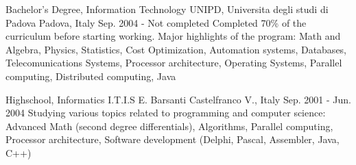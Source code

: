 
\begin{cventries}

  \cventry
    {Bachelor's Degree, Information Technology} %
    {UNIPD, Universita degli studi di Padova \textmd{}} %
    {Padova, Italy} %
    {Sep. 2004 - Not completed} %
    {Completed 70\% of the curriculum before starting working. Major highlights of the program:\newline
    Math and Algebra, Physics, Statistics, Cost Optimization, Automation systems, Databases, Telecomunications Systems, Processor architecture, Operating Systems, Parallel computing, Distributed computing, Java
    }

  \cventry
    {Highschool, Informatics} %
    {I.T.I.S E. Barsanti} %
    {Castelfranco V., Italy} %
    {Sep. 2001 - Jun. 2004} %
    {Studying various topics related to programming and computer science:\newline
    Advanced Math (second degree differentials), Algorithms, Parallel computing, Processor architecture, Software development (Delphi, Pascal, Assembler, Java, C++)
    }

\end{cventries}
